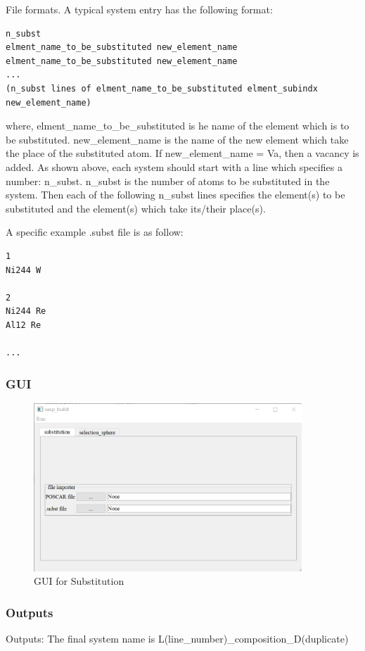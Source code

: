 \documentclass[12pt]{book}
\begin{document}
File formats. A typical system entry has the following format:
\begin{lstlisting}
n_subst
elment_name_to_be_substituted new_element_name
elment_name_to_be_substituted new_element_name
...
(n_subst lines of elment_name_to_be_substituted elment_subindx new_element_name)
\end{lstlisting}
where,
elment\_name\_to\_be\_substituted is he name of the element which is to be substituted.
new\_element\_name is the name of the new element which take the place of the substituted atom. If new\_element\_name = Va, then a vacancy is added.
As shown above, each system should start with a line which specifies a number: n\_subst.
n\_subst is the number of atoms to be substituted in the system.
Then each of the following n\_subst lines specifies the element(s) to be substituted and the element(s) which take its/their place(s).

A specific example .subst file is as follow:
\begin{lstlisting}
1
Ni244 W

2
Ni244 Re
Al12 Re

...
\end{lstlisting}

\subsubsection{GUI}
\begin{figure}[htbp]
\centering
\includegraphics[width=0.9\textwidth]{gui_substitution.pdf}
\caption{GUI for Substitution}
\label{fig:GUI_Substitution}
\end{figure}

\subsubsection{Outputs}
Outputs: The final system name is L(line\_number)\_composition\_D(duplicate)
\end{document}
